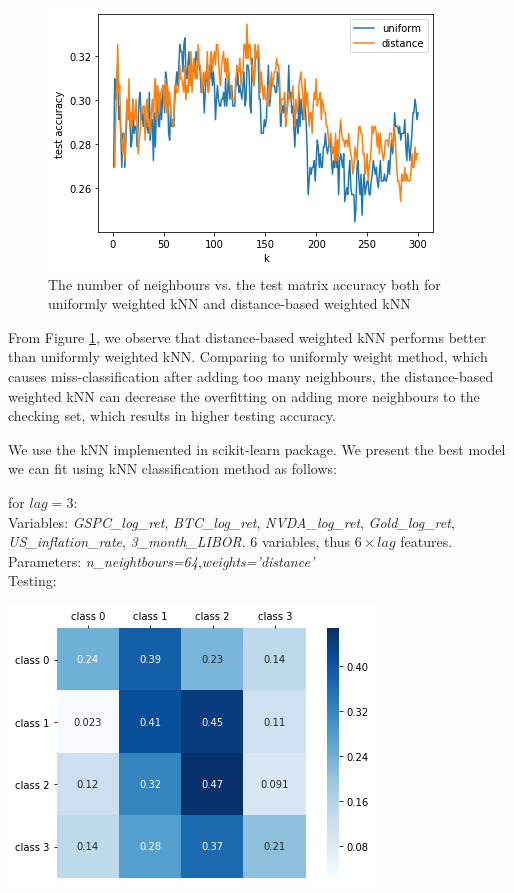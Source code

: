 \documentclass[9pt,twocolumn,twoside]{ilcss}
\begin{document}
\begin{figure}[h]
\centering
\includegraphics[width=0.8\linewidth]{kNN_trend.png}
\caption{The number of neighbours vs. the test matrix accuracy both for uniformly weighted kNN and distance-based weighted kNN}
\label{kNN_trend}
\end{figure}

From Figure \ref{kNN_trend}, we observe that distance-based weighted kNN performs better than uniformly weighted kNN.  Comparing to uniformly weight method, which causes miss-classification after adding too many neighbours, the distance-based weighted kNN can decrease the overfitting on adding more neighbours to the checking set, which results in higher testing accuracy. 

We use the kNN implemented in scikit-learn package. We present the best model we can fit using kNN classification method as follows:

\noindent  for $lag = 3$:
\smallskip\\
Variables: \textit{GSPC\_log\_ret}, \textit{BTC\_log\_ret}, \textit{NVDA\_log\_ret}, \textit{Gold\_log\_ret}, \textit{US\_inflation\_rate}, \textit{3\_month\_LIBOR}. 6 variables, thus $6\times lag$ features.\\
Parameters: \textit{n\_neightbours=64},\textit{weights='distance'}
\smallskip\\
Testing:

\begin{center}
\includegraphics[scale=0.35]{kNN_test.png}
\end{center}
\end{document}
